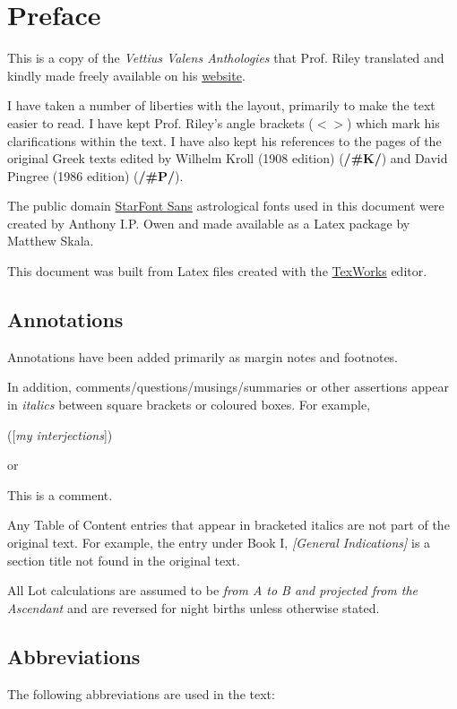 \chapter{Preface}
This is a copy of the \textit{Vettius Valens Anthologies} that Prof. Riley translated and kindly made freely available on his \href{https://www.csus.edu/indiv/r/rileymt/}{website}.

I have taken a number of liberties with the layout, primarily to make the text easier to read. I have kept Prof. Riley's angle brackets ($< >$) which mark his clarifications within the text. I have also kept his references to the pages of the original Greek texts edited by Wilhelm Kroll (1908 edition) (\textbf{/\#K/}) and David Pingree (1986 edition) (\textbf{/\#P/}). 

The public domain \href{https://www.ctan.org/pkg/starfont}{StarFont Sans} astrological fonts used in this document were created by Anthony I.P. Owen and made available as a Latex package by Matthew Skala. 

This document was built from Latex files created with the \href{https://www.tug.org/texworks/}{TexWorks} editor.

\section{Annotations}

Annotations have been added primarily as margin notes and footnotes. 

In addition, comments/questions/musings/summaries or other assertions appear in \textit{italics} between square brackets or coloured boxes. For example, 

([\textit{my interjections}])

 or
\begin{mdframed}[backgroundcolor=cyan!5, rightmargin=1em, leftmargin=1em]
This is a comment.
\end{mdframed}

Any Table of Content entries that appear in bracketed italics are not part of the original text. For example, the entry under Book I, \textit{[General Indications]} is a section title not found in the original text.

All Lot calculations are assumed to be \textsl{from A to B and projected from the Ascendant} and are reversed for night births unless otherwise stated. 

\section{Abbreviations}
The following abbreviations are used in the text:

